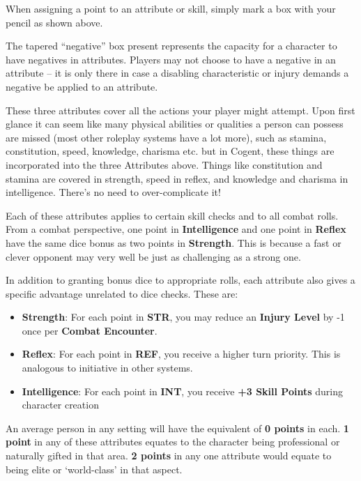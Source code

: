 When assigning a point to an attribute or skill, simply mark a box with your pencil as shown above.

The tapered “negative” box present represents the capacity for a character to have negatives in attributes. Players may not choose to have a negative in an attribute – it is only there in case a disabling characteristic or injury demands a negative be applied to an attribute.

These three attributes cover all the actions your player might attempt. Upon first glance it can seem like many physical abilities or qualities a person can possess are missed (most other roleplay systems have a lot more), such as stamina, constitution, speed, knowledge, charisma etc. but in Cogent, these things are incorporated into the three Attributes above. Things like constitution and stamina are covered in strength, speed in reflex, and knowledge and charisma in intelligence. There's no need to over-complicate it!

Each of these attributes applies to certain skill checks and to all combat rolls. From a combat perspective, one point in \textbf{Intelligence} and one point in \textbf{Reflex} have the same dice bonus as two points in \textbf{Strength}. This is because a fast or clever opponent may very well be just as challenging as a strong one.

In addition to granting bonus dice to appropriate rolls, each attribute also gives a specific advantage unrelated to dice checks. These are:

\begin{itemize}
    \item \textbf{Strength}: For each point in \textbf{STR}, you may reduce an \textbf{Injury Level} by -1 once per \textbf{Combat Encounter}.
    \item \textbf{Reflex}: For each point in \textbf{REF}, you receive a higher turn priority. This is analogous to initiative in other systems.
    \item \textbf{Intelligence}: For each point in \textbf{INT}, you receive \textbf{+3 Skill Points} during character creation
\end{itemize}

An average person in any setting will have the equivalent of \textbf{0 points} in each. \textbf{1 point} in any of these attributes equates to the character being professional or naturally gifted in that area. \textbf{2 points} in any one attribute would equate to being elite or `world-class' in that aspect.

